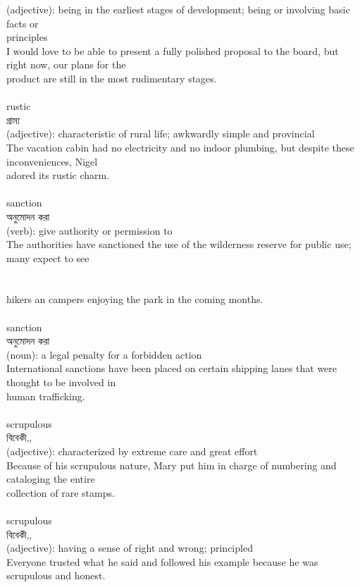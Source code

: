 \documentclass{article}
\begin{document}
{(adjective): being in the earliest stages of development; being or involving basic facts or\\principles\\I would love to be able to present a fully polished proposal to the board, but right now, our plans for the\\product are still in the most rudimentary stages.\\}\\
{rustic}\\
{গ্রাম্য}\\
{(adjective): characteristic of rural life; awkwardly simple and provincial\\The vacation cabin had no electricity and no indoor plumbing, but despite these inconveniences, Nigel\\adored its rustic charm.\\}\\
{sanction}\\
{অনুমোদন  করা}\\
{(verb): give authority or permission to\\The authorities have sanctioned the use of the wilderness reserve for public use; many expect to see\\\\                                                                                 \\hikers an campers enjoying the park in the coming months.\\}\\
{sanction}\\
{অনুমোদন  করা}\\
{(noun): a legal penalty for a forbidden action\\International sanctions have been placed on certain shipping lanes that were thought to be involved in\\human trafficking.\\}\\
{scrupulous}\\
{বিবেকী,,}\\
{(adjective): characterized by extreme care and great effort\\Because of his scrupulous nature, Mary put him in charge of numbering and cataloging the entire\\collection of rare stamps.\\}\\
{scrupulous}\\
{বিবেকী,,}\\
{(adjective): having a sense of right and wrong; principled\\Everyone trusted what he said and followed his example because he was scrupulous and honest.\\}\\
\end{document}
